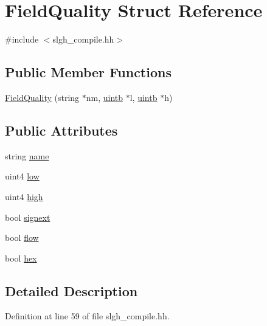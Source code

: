 \hypertarget{struct_field_quality}{}\section{Field\+Quality Struct Reference}
\label{struct_field_quality}


{\ttfamily \#include $<$slgh\+\_\+compile.\+hh$>$}

\subsection*{Public Member Functions}
\begin{DoxyCompactItemize}
\item 
\mbox{\hyperlink{struct_field_quality_ae051ae20b019881acf37cf021adcd90d}{Field\+Quality}} (string $\ast$nm, \mbox{\hyperlink{types_8h_a2db313c5d32a12b01d26ac9b3bca178f}{uintb}} $\ast$l, \mbox{\hyperlink{types_8h_a2db313c5d32a12b01d26ac9b3bca178f}{uintb}} $\ast$h)
\end{DoxyCompactItemize}
\subsection*{Public Attributes}
\begin{DoxyCompactItemize}
\item 
string \mbox{\hyperlink{struct_field_quality_aae4142548f31eee7c90a60aa77136333}{name}}
\item 
uint4 \mbox{\hyperlink{struct_field_quality_a04c4b1c557d5cdb7665d312eb40e6de6}{low}}
\item 
uint4 \mbox{\hyperlink{struct_field_quality_a3113058a16294bbb876a42c19fc43363}{high}}
\item 
bool \mbox{\hyperlink{struct_field_quality_ae530ddb1a99aee0c1f68bc99704a8ec2}{signext}}
\item 
bool \mbox{\hyperlink{struct_field_quality_a64c5ba59f7b60f7ba0df52018ef410fb}{flow}}
\item 
bool \mbox{\hyperlink{struct_field_quality_a6ada953369737161f1133c4f5cbd7b7c}{hex}}
\end{DoxyCompactItemize}


\subsection{Detailed Description}


Definition at line 59 of file slgh\+\_\+compile.\+hh.




